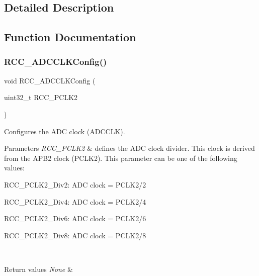\subsection{Detailed Description}


\subsection{Function Documentation}
\mbox{\label{group___r_c_c___exported___functions_gadda89cdb838bf49e5fa10f3f774530a4}} 
\subsubsection{\texorpdfstring{RCC\_ADCCLKConfig()}{RCC\_ADCCLKConfig()}}
{\footnotesize\ttfamily void R\+C\+C\+\_\+\+A\+D\+C\+C\+L\+K\+Config (\begin{DoxyParamCaption}\item[{uint32\+\_\+t}]{R\+C\+C\+\_\+\+P\+C\+L\+K2 }\end{DoxyParamCaption})}



Configures the A\+DC clock (A\+D\+C\+C\+LK). 


\begin{DoxyParams}{Parameters}
{\em R\+C\+C\+\_\+\+P\+C\+L\+K2} & defines the A\+DC clock divider. This clock is derived from the A\+P\+B2 clock (P\+C\+L\+K2). This parameter can be one of the following values\+: \begin{DoxyItemize}
\item R\+C\+C\+\_\+\+P\+C\+L\+K2\+\_\+\+Div2\+: A\+DC clock = P\+C\+L\+K2/2 \item R\+C\+C\+\_\+\+P\+C\+L\+K2\+\_\+\+Div4\+: A\+DC clock = P\+C\+L\+K2/4 \item R\+C\+C\+\_\+\+P\+C\+L\+K2\+\_\+\+Div6\+: A\+DC clock = P\+C\+L\+K2/6 \item R\+C\+C\+\_\+\+P\+C\+L\+K2\+\_\+\+Div8\+: A\+DC clock = P\+C\+L\+K2/8 \end{DoxyItemize}
\\
\hline
\end{DoxyParams}

\begin{DoxyRetVals}{Return values}
{\em None} & \\
\hline
\end{DoxyRetVals}
\mbox{\label{group___r_c_c___exported___functions_gaa2d6a35f5c2e0f86317c3beb222677fc}} 
